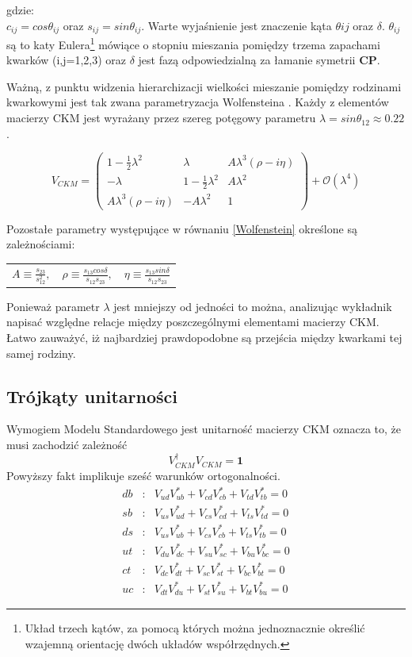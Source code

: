 gdzie:\\
$c_{ij}=cos\theta_{ij}$ oraz $s_{ij}=sin\theta_{ij}$. Warte wyjaśnienie jest znaczenie kąta $\theta{ij}$ oraz $\delta$. $\theta_{ij}$ są to katy Eulera\footnote{Układ trzech kątów, za pomocą których można jednoznacznie określić wzajemną orientację dwóch układów współrzędnych.} mówiące o stopniu mieszania pomiędzy trzema zapachami kwarków (i,j=1,2,3) oraz $\delta$ jest fazą odpowiedzialną za łamanie symetrii \textbf{CP}.

Ważną, z punktu widzenia hierarchizacji wielkości mieszanie pomiędzy rodzinami kwarkowymi jest tak zwana parametryzacja Wolfensteina \cite{Wolfenstein}. Każdy z elementów macierzy CKM jest wyrażany przez szereg potęgowy parametru $\lambda=sin\theta_{12}\approx 0.22$ .

\begin{equation}
V_{CKM}=\begin{pmatrix}
1-\frac{1}{2}\lambda^2& \lambda & A\lambda^3(\rho-i\eta)\\
-\lambda & 1-\frac{1}{2}\lambda^2 & A\lambda^2\\
 A\lambda^3(\rho-i\eta) & -A\lambda^2 & 1
\end{pmatrix} +\mathcal{O}(\lambda^4) 
\label{Wolfenstein}
\end{equation}

Pozostałe parametry występujące w równaniu \ref{Wolfenstein} określone są zależnościami:
\begin{center}
\begin{tabular}{l c r}
$A \equiv \frac{s_{23}}{s^2_{12}},$&  $\rho \equiv  \frac{s_{13}cos\delta}{s_{12}s_{23}},$ & $\eta  \equiv \frac{s_{13}sin\delta}{s_{12}s_{23}}$
\end{tabular}
\end{center}

Ponieważ parametr $\lambda$ jest mniejszy od jedności to można, analizując wykładnik napisać względne relacje między poszczególnymi elementami macierzy CKM. Łatwo zauważyć, iż najbardziej prawdopodobne są przejścia między kwarkami tej samej rodziny.
\subsection{Trójkąty unitarności}

Wymogiem Modelu Standardowego jest unitarność macierzy CKM oznacza to, że musi zachodzić zależność
\begin{equation}
V^{\dagger}_{CKM}V_{CKM}=\mathbf{1}
\end{equation}
Powyższy fakt implikuje sześć warunków ortogonalności.
\begin{eqnarray}
db&:&V_{ud}V^*_{ub}+V_{cd}V^*_{cb}+V_{td}V^*_{tb}=0  \\
sb&:&V_{us}V^*_{ud}+V_{cs}V^*_{cd}+V_{ts}V^*_{td}=0  \\
ds&:&V_{us}V^*_{ub}+V_{cs}V^*_{cb}+V_{ts}V^*_{tb}=0  \\
ut&:&V_{du}V^*_{dc}+V_{su}V^*_{sc}+V_{bu}V^*_{bc}=0  \\
ct&:&V_{dc}V^*_{dt}+V_{sc}V^*_{st}+V_{bc}V^*_{bt}=0  \\
uc&:&V_{dt}V^*_{du}+V_{st}V^*_{su}+V_{bt}V^*_{bu}=0  
\end{eqnarray}


